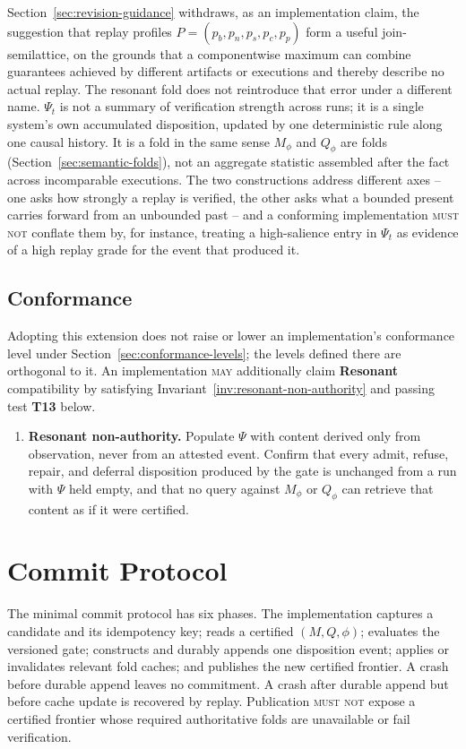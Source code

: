 \documentclass[11pt]{article}
\newcommand{\MUSTNOT}{\textsc{must not}}
\newcommand{\MAY}{\textsc{may}}
\begin{document}
Section~\ref{sec:revision-guidance} withdraws, as an implementation claim, the suggestion that replay profiles $P=(p_b,p_n,p_s,p_c,p_p)$ form a useful join-semilattice, on the grounds that a componentwise maximum can combine guarantees achieved by different artifacts or executions and thereby describe no actual replay. The resonant fold does not reintroduce that error under a different name. $\Psi_t$ is not a summary of verification strength across runs; it is a single system's own accumulated disposition, updated by one deterministic rule along one causal history. It is a fold in the same sense $M_\phi$ and $Q_\phi$ are folds (Section~\ref{sec:semantic-folds}), not an aggregate statistic assembled after the fact across incomparable executions. The two constructions address different axes -- one asks how strongly a replay is verified, the other asks what a bounded present carries forward from an unbounded past -- and a conforming implementation \MUSTNOT{} conflate them by, for instance, treating a high-salience entry in $\Psi_t$ as evidence of a high replay grade for the event that produced it.

\subsection{Conformance}

Adopting this extension does not raise or lower an implementation's conformance level under Section~\ref{sec:conformance-levels}; the levels defined there are orthogonal to it. An implementation \MAY{} additionally claim \textbf{Resonant} compatibility by satisfying Invariant~\ref{inv:resonant-non-authority} and passing test \textbf{T13} below.

\begin{enumerate}[label=\textbf{T13}.,leftmargin=*]
\item \textbf{Resonant non-authority.} Populate $\Psi$ with content derived only from observation, never from an attested event. Confirm that every admit, refuse, repair, and deferral disposition produced by the gate is unchanged from a run with $\Psi$ held empty, and that no query against $M_\phi$ or $Q_\phi$ can retrieve that content as if it were certified.
\end{enumerate}

\section{Commit Protocol}

The minimal commit protocol has six phases. The implementation captures a candidate and its idempotency key; reads a certified $(M,Q,\phi)$; evaluates the versioned gate; constructs and durably appends one disposition event; applies or invalidates relevant fold caches; and publishes the new certified frontier. A crash before durable append leaves no commitment. A crash after durable append but before cache update is recovered by replay. Publication \MUSTNOT{} expose a certified frontier whose required authoritative folds are unavailable or fail verification.
\end{document}
